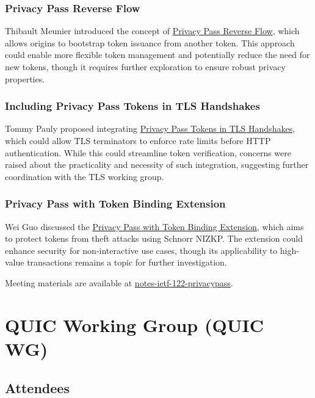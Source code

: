 \documentclass{article}
\begin{document}
\subsubsection{Privacy Pass Reverse Flow}
Thibault Meunier introduced the concept of \href{https://datatracker.ietf.org/doc/draft-meunier-privacypass-reverse-flow/}{Privacy Pass Reverse Flow}, which allows origins to bootstrap token issuance from another token. This approach could enable more flexible token management and potentially reduce the need for new tokens, though it requires further exploration to ensure robust privacy properties.

\subsubsection{Including Privacy Pass Tokens in TLS Handshakes}
Tommy Pauly proposed integrating \href{https://datatracker.ietf.org/doc/draft-pauly-privacypass-for-tls/}{Privacy Pass Tokens in TLS Handshakes}, which could allow TLS terminators to enforce rate limits before HTTP authentication. While this could streamline token verification, concerns were raised about the practicality and necessity of such integration, suggesting further coordination with the TLS working group.

\subsubsection{Privacy Pass with Token Binding Extension}
Wei Guo discussed the \href{https://datatracker.ietf.org/doc/draft-guo-privacypass-token-binding/}{Privacy Pass with Token Binding Extension}, which aims to protect tokens from theft attacks using Schnorr NIZKP. The extension could enhance security for non-interactive use cases, though its applicability to high-value transactions remains a topic for further investigation.

Meeting materials are available at \href{https://notes.ietf.org/notes-ietf-122-privacypass}{notes-ietf-122-privacypass}.




\newpage

\section{QUIC Working Group (QUIC WG)}

\subsection{Attendees}
\end{document}
